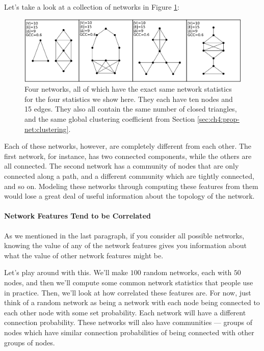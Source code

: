 Let's take a look at a collection of networks in Figure \ref{fig:ch4:anascombe}:

\begin{figure}[h]
    \centering
    \includegraphics[width=\linewidth]{representations/ch4/Images/anascombe.jpeg}
    \caption[Very different networks can have the same summary statistics]{Four networks, all of which have the exact same network statistics for the four statistics we show here. They each have ten nodes and 15 edges. They also all contain the same number of closed triangles, and the same global clustering coefficient from Section \ref{sec:ch4:prop-net:clustering}.}
    \label{fig:ch4:anascombe}
\end{figure}

Each of these networks, however, are completely different from each other. The first network, for instance, has two connected components, while the others are all connected. The second network has a community of nodes that are only connected along a path, and a different community which are tightly connected, and so on. Modeling these networks through computing these features from them would lose a great deal of useful information about the topology of the network.


\paragraph{Network Features Tend to be Correlated}
\label{sec:ch4:net-rep:featurelims}

As we mentioned in the last paragraph, if you consider all possible networks, knowing the value of any of the network features gives you information about what the value of other network features might be.

Let's play around with this. We'll make $100$ random networks, each with $50$ nodes, and then we'll compute some common network statistics that people use in practice. Then, we'll look at how correlated these features are. For now, just think of a random network as being a network with each node being connected to each other node with some set probability. Each network will have a different connection probability. These networks will also have communities --- groups of nodes which have similar connection probabilities of being connected with other groups of nodes. 

